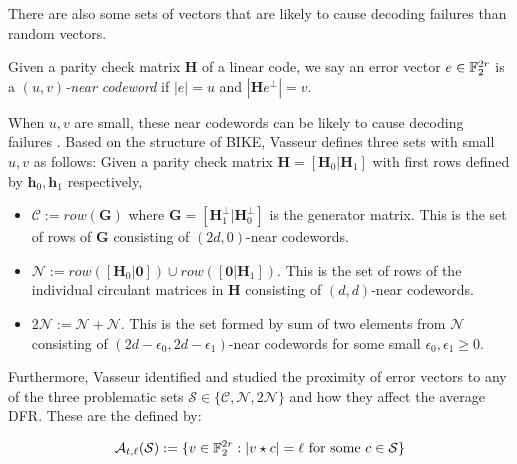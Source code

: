 There are also some sets of vectors that are likely to cause decoding failures than random vectors.

\begin{defn}
Given a parity check matrix $\mathbf{H}$ of a linear code, we say an error vector $e \in \mathbb{F}_2^{2r}$ is a \textit{$(u,v)$-near codeword} if $|e| = u$ and $|\mathbf{H}e^\perp|=v$.
\end{defn}

When $u, v$ are small, these near codewords can be likely to cause decoding failures \cite{Richardson03}. Based on the structure of BIKE, Vasseur defines three sets with small $u,v$ as follows: Given a parity check matrix $\mathbf{H} = [\mathbf{H}_0 | \mathbf{H}_1 ]$ with first rows defined by $\mathbf{h}_0, \mathbf{h}_1$ respectively,

\begin{itemize}
\item $\mathcal{C} := row(\mathbf{G})$ where $\mathbf{G} = [ \mathbf{H}_1^\perp | \mathbf{H}_0^\perp ]$ is the generator matrix. This is the set of rows of $\mathbf{G}$ consisting of $(2d,0)$-near codewords.
\item $\mathcal{N} := row([\mathbf{H}_0 | \mathbf{0}]) \cup row([\mathbf{0} | \mathbf{H}_1])$. This is the set of rows of the individual circulant matrices in $\mathbf{H}$ consisting of $(d,d)$-near codewords.
\item $2\mathcal{N} := \mathcal{N} + \mathcal{N}$. This is the set formed by sum of two elements from $\mathcal{N}$ consisting of $(2d - \epsilon_0, 2d - \epsilon_1)$-near codewords for some small $\epsilon_0,\epsilon_1\geq 0$.
\end{itemize}

Furthermore, Vasseur identified and studied the proximity of error vectors to any of the three problematic sets $\mathcal{S} \in \{ \mathcal{C}, \mathcal{N}, 2\mathcal{N} \}$ and how they affect the average DFR. These are the defined by:

\[
\mathcal{A}_{t, \ell}(\mathcal{S}) := \{ v \in \mathbb{F}_2^{2r} : |v \star c | = \ell \text{ for some } c \in \mathcal{S} \}
\]

